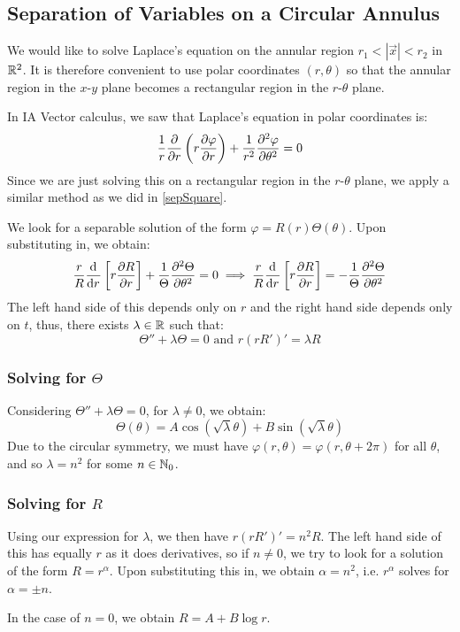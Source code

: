 \documentclass[../main.tex]{subfiles}
\begin{document}
\subsection{Separation of Variables on a Circular Annulus}
We would like to solve Laplace's equation on the annular region $r_1 < |\vec{x}| < r_2$ in $\mathbb{R}^2$.
It is therefore convenient to use polar coordinates $(r, \theta)$ so that the annular region in the $x$-$y$ plane becomes a rectangular region in the $r$-$\theta$ plane.

In IA Vector calculus, we saw that Laplace's equation in polar coordinates is:
\[
  \frac{1}{r} \pderiv{}{r}\left(r \pderiv{\varphi}{r}\right) + \frac{1}{r^2} \pderiv[2]{\varphi}{\theta} = 0
\]
Since we are just solving this on a rectangular region in the $r$-$\theta$ plane, we apply a similar method as we did in \cref{sepSquare}.

We look for a separable solution of the form $\varphi = R(r) \Theta(\theta)$.
Upon substituting in, we obtain:
\[
  \frac{r}{R} \deriv{}{r}\left[r \pderiv{R}{r}\right] + \frac{1}{\Theta} \pderiv[2]{\Theta}{\theta} = 0 \implies \frac{r}{R} \deriv{}{r}\left[r \pderiv{R}{r}\right] = - \frac{1}{\Theta} \pderiv[2]{\Theta}{\theta}
\]
The left hand side of this depends only on $r$ and the right hand side depends only on $t$, thus, there exists $\lambda \in \mathbb{R}$ such that:
\[
  \Theta'' + \lambda \Theta = 0 \text{ and } r(rR')' = \lambda R
\]
\subsubsection{Solving for $\Theta$}
Considering $\Theta'' + \lambda \Theta = 0$, for $\lambda \neq 0$, we obtain:
\[
  \Theta(\theta) = A \cos(\sqrt{\lambda} \theta) + B \sin(\sqrt{\lambda} \theta)
\]
Due to the circular symmetry, we must have  $\varphi(r, \theta) = \varphi(r, \theta + 2\pi)$ for all $\theta$, and so $\lambda = n^2$ for some $n \in \mathbb{N}_0$.

\subsubsection{Solving for $R$}
Using our expression for $\lambda$, we then have $r(rR')' = n^2 R$.
The left hand side of this has equally $r$ as it does derivatives, so if $n \neq 0$, we try to look for a solution of the form $R = r^\alpha$.
Upon substituting this in, we obtain $\alpha = n^2$, i.e. $r^\alpha$ solves for $\alpha = \pm n$.

In the case of $n =0$, we obtain $R = A + B \log r$.
\end{document}
